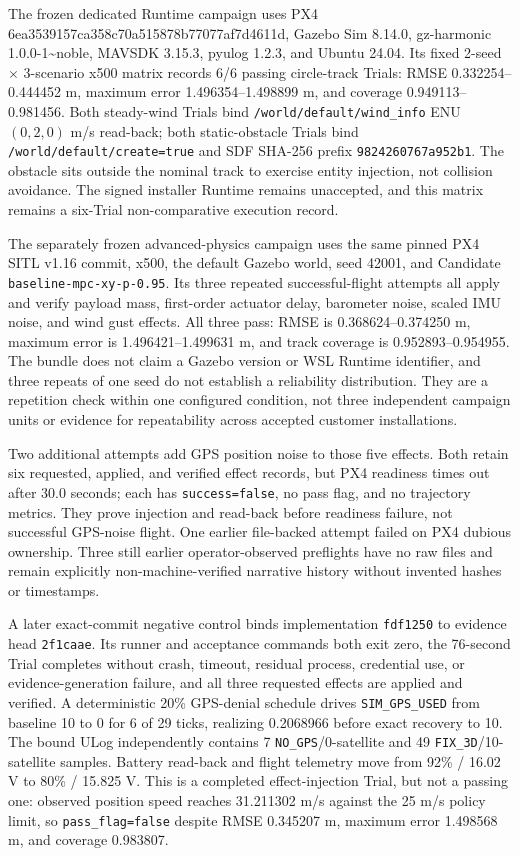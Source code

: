 The frozen dedicated Runtime campaign uses PX4
6ea3539157ca358c70a515878b77077af7d4611d, Gazebo Sim 8.14.0,
gz-harmonic 1.0.0-1\textasciitilde{}noble, MAVSDK 3.15.3, pyulog 1.2.3,
and Ubuntu 24.04. Its fixed 2-seed $\times$ 3-scenario x500 matrix records
6/6 passing circle-track Trials: RMSE 0.332254--0.444452 m, maximum error
1.496354--1.498899 m, and coverage 0.949113--0.981456. Both steady-wind
Trials bind \texttt{/world/default/wind\_info} ENU $(0,2,0)$ m/s
read-back; both static-obstacle Trials bind
\texttt{/world/default/create=true} and SDF SHA-256 prefix
\texttt{9824260767a952b1}. The obstacle sits outside the nominal track to
exercise entity injection, not collision avoidance. The signed installer
Runtime remains unaccepted, and this matrix remains a six-Trial
non-comparative execution record.

The separately frozen advanced-physics campaign uses the same pinned PX4
SITL v1.16 commit, x500, the default Gazebo world, seed 42001, and Candidate
\texttt{baseline-mpc-xy-p-0.95}. Its three repeated successful-flight
attempts all apply and verify payload mass, first-order actuator delay,
barometer noise, scaled IMU noise, and wind gust effects. All three pass:
RMSE is 0.368624--0.374250 m, maximum error is
1.496421--1.499631 m, and track coverage is 0.952893--0.954955. The
bundle does not claim a Gazebo version or WSL Runtime identifier, and
three repeats of one seed do not establish a reliability distribution.
They are a repetition check within one configured condition, not three
independent campaign units or evidence for repeatability across accepted
customer installations.

Two additional attempts add GPS position noise to those five effects.
Both retain six requested, applied, and verified effect records, but PX4
readiness times out after 30.0 seconds; each has
\texttt{success=false}, no pass flag, and no trajectory metrics. They
prove injection and read-back before readiness failure, not successful
GPS-noise flight. One earlier file-backed attempt failed on PX4 dubious
ownership. Three still earlier operator-observed preflights have no raw
files and remain explicitly non-machine-verified narrative history
without invented hashes or timestamps.

A later exact-commit negative control binds implementation
\texttt{fdf1250} to evidence head \texttt{2f1caae}. Its runner and
acceptance commands both exit zero, the 76-second Trial completes without
crash, timeout, residual process, credential use, or evidence-generation
failure, and all three requested effects are applied and verified. A
deterministic 20\% GPS-denial schedule drives \texttt{SIM\_GPS\_USED}
from baseline 10 to 0 for 6 of 29 ticks, realizing 0.2068966 before exact
recovery to 10. The bound ULog independently contains 7
\texttt{NO\_GPS}/0-satellite and 49 \texttt{FIX\_3D}/10-satellite samples.
Battery read-back and flight telemetry move from 92\% / 16.02 V to
80\% / 15.825 V. This is a completed effect-injection Trial, but not a
passing one: observed position speed reaches 31.211302 m/s against the
25 m/s policy limit, so \texttt{pass\_flag=false} despite RMSE
0.345207 m, maximum error 1.498568 m, and coverage 0.983807.

